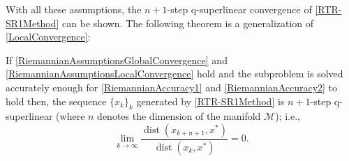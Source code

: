 With all these assumptions, the $n + 1$-step q-superlinear convergence of \cref{RTR-SR1Method} can be shown. The following theorem is a generalization of \cref{LocalConvergence}:
\begin{theorem} \label{RiemannianLocalConvergence}
    If \cref{RiemannianAssumptionsGlobalConvergence} and \cref{RiemannianAssumptionsLocalConvergence} hold and the subproblem is solved accurately enough for \cref{RiemannianAccuracy1} and \cref{RiemannianAccuracy2} to hold then, the sequence $\{ x_k \}_k$ generated by \cref{RTR-SR1Method} is $n + 1$-step q-superlinear (where $n$ denotes the dimension of the manifold $\mathcal{M}$); i.e.,
    \begin{equation}
        \lim_{k \rightarrow \infty} \frac{\operatorname{dist}(x_{k+n+1}, x^*)}{\operatorname{dist}(x_k, x^*)} = 0.
    \end{equation}
\end{theorem}